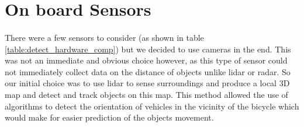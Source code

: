 \documentclass[a4paper]{report}
\begin{document}
\section{On board Sensors}
\paragraph{} There were a few sensors to consider (as shown in table \ref{table:detect_hardware_comp}) but we decided to use cameras in the end. This was not an immediate and obvious choice however, as this type of sensor could not immediately collect data on the distance of objects unlike lidar or radar. So our initial choice was to use lidar to sense surroundings and produce a local 3D map and detect and track objects on this map. This method allowed the use of algorithms to detect the orientation of vehicles in the vicinity of the bicycle which would make for easier prediction of the objects movement.
\end{document}
